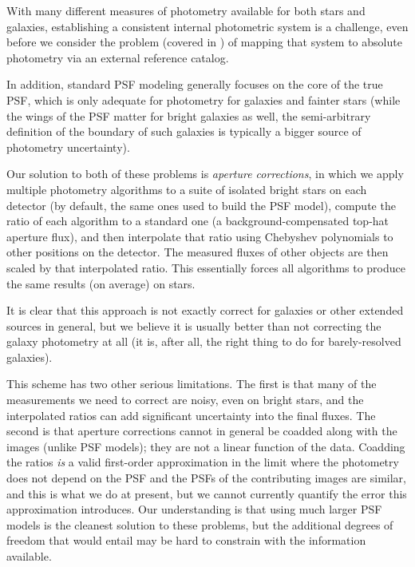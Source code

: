 With many different measures of photometry available for both stars and galaxies, establishing a consistent internal photometric system is a challenge, even before we consider the problem (covered in ) of mapping that system to absolute photometry via an external reference catalog.

In addition, standard PSF modeling  generally focuses on the core of the true PSF, which is only adequate for photometry for galaxies and fainter stars (while the wings of the PSF matter for bright galaxies as well, the semi-arbitrary definition of the boundary of such galaxies is typically a bigger source of photometry uncertainty).

Our solution to both of these problems is \emph{aperture corrections}, in which we apply multiple photometry algorithms to a suite of isolated bright stars on each detector (by default, the same ones used to build the PSF model), compute the ratio of each algorithm to a standard one (a background-compensated top-hat aperture flux), and then interpolate that ratio using Chebyshev polynomials to other positions on the detector.
The measured fluxes of other objects are then scaled by that interpolated ratio.
This essentially forces all algorithms to produce the same results (on average) on stars.

It is clear that this approach is not exactly correct for galaxies or other extended sources in general, but we believe it is usually better than not correcting the galaxy photometry at all (it is, after all, the right thing to do for barely-resolved galaxies).

This scheme has two other serious limitations.
The first is that many of the measurements we need to correct are noisy, even on bright stars, and the interpolated ratios can add significant uncertainty into the final fluxes.
The second is that aperture corrections cannot in general be coadded along with the images (unlike PSF models); they are not a linear function of the data.
Coadding the ratios \emph{is} a valid first-order approximation in the limit where the photometry does not depend on the PSF and the PSFs of the contributing images are similar, and this is what we do at present, but we cannot currently  quantify the error this approximation introduces.
Our understanding is that using much larger PSF models is the cleanest solution to these problems, but the additional degrees of freedom that would entail may be hard to constrain with the information available.

